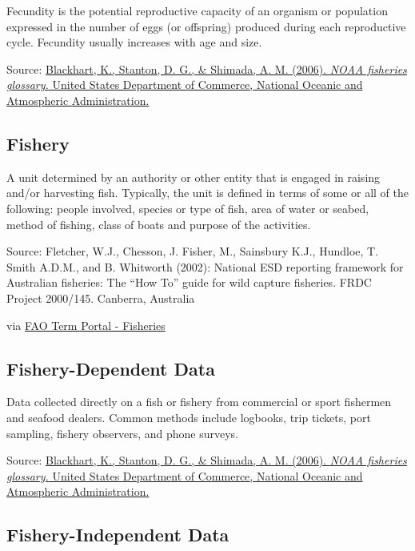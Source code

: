 \documentclass[
  11pt,
]{book}
\begin{document}
Fecundity is the potential reproductive capacity of an organism or population expressed in the number of eggs (or offspring) produced during each reproductive cycle. Fecundity usually increases with age and size.

Source: \href{https://repository.library.noaa.gov/view/noaa/12856}{Blackhart, K., Stanton, D. G., \& Shimada, A. M. (2006). \emph{NOAA fisheries glossary.} United States Department of Commerce, National Oceanic and Atmospheric Administration.}

\hypertarget{fishery}{%
\subsection{Fishery}\label{fishery}}

A unit determined by an authority or other entity that is engaged in raising and/or harvesting fish. Typically, the unit is defined in terms of some or all of the following: people involved, species or type of fish, area of water or seabed, method of fishing, class of boats and purpose of the activities.

Source: Fletcher, W.J., Chesson, J. Fisher, M., Sainsbury K.J., Hundloe, T. Smith A.D.M., and B. Whitworth (2002): National ESD reporting framework for Australian fisheries: The ``How To'' guide for wild capture fisheries. FRDC Project 2000/145. Canberra, Australia

via \href{http://www.fao.org/fishery/glossary/en}{FAO Term Portal - Fisheries}

\hypertarget{fishery-dependent-data}{%
\subsection{Fishery-Dependent Data}\label{fishery-dependent-data}}

Data collected directly on a fish or fishery from commercial or sport fishermen and seafood dealers. Common methods include logbooks, trip tickets, port sampling, fishery observers, and phone surveys.

Source: \href{https://repository.library.noaa.gov/view/noaa/12856}{Blackhart, K., Stanton, D. G., \& Shimada, A. M. (2006). \emph{NOAA fisheries glossary.} United States Department of Commerce, National Oceanic and Atmospheric Administration.}

\hypertarget{fishery-independent-data}{%
\subsection{Fishery-Independent Data}\label{fishery-independent-data}}
\end{document}
